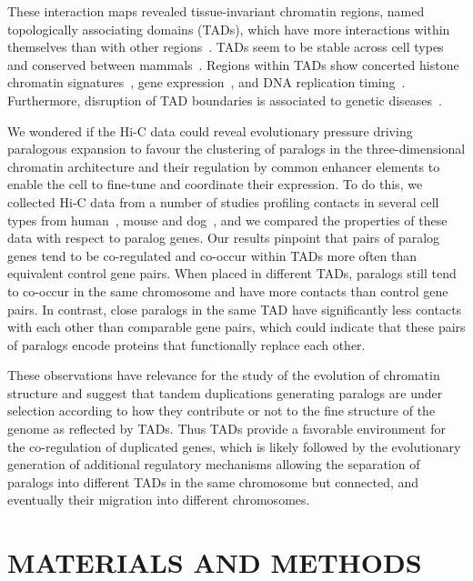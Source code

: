 \documentclass[a4paper,twoside=true,openright,parskip=full,chapterprefix=true,11pt,headings=normal,bibliography=totoc,listof=totoc,titlepage=on,captions=tableabove,draft=false]{scrreprt}
\theoremstyle{definition}
\theoremstyle{definition}
\theoremstyle{definition}
\theoremstyle{remark}
\begin{document}
These interaction maps revealed tissue-invariant chromatin regions,
named topologically associating domains (TADs), which have more
interactions within themselves than with other
regions~\citep{Dixon2012, Nora2012, Sexton2012}. TADs seem to be stable
across cell types and conserved between
mammals~\citep{Dixon2012, Rao2014, VietriRudan2015}. Regions within TADs
show concerted histone chromatin
signatures~\citep{Dixon2012, Sexton2012}, gene
expression~\citep{LeDily2014, Nora2012}, and DNA replication
timing~\citep{Pope2014}. Furthermore, disruption of TAD boundaries is
associated to genetic diseases~\citep{Ibn-Salem2014, Lupianez2015}.

We wondered if the Hi-C data could reveal evolutionary pressure driving
paralogous expansion to favour the clustering of paralogs in the
three-dimensional chromatin architecture and their regulation by common
enhancer elements to enable the cell to fine-tune and coordinate their
expression. To do this, we collected Hi-C data from a number of studies
profiling contacts in several cell types from
human~\citep{Dixon2012, Rao2014}, mouse and dog~\citep{VietriRudan2015},
and we compared the properties of these data with respect to paralog
genes. Our results pinpoint that pairs of paralog genes tend to be
co-regulated and co-occur within TADs more often than equivalent control
gene pairs. When placed in different TADs, paralogs still tend to
co-occur in the same chromosome and have more contacts than control gene
pairs. In contrast, close paralogs in the same TAD have significantly
less contacts with each other than comparable gene pairs, which could
indicate that these pairs of paralogs encode proteins that functionally
replace each other.

These observations have relevance for the study of the evolution of
chromatin structure and suggest that tandem duplications generating
paralogs are under selection according to how they contribute or not to
the fine structure of the genome as reflected by TADs. Thus TADs provide
a favorable environment for the co-regulation of duplicated genes, which
is likely followed by the evolutionary generation of additional
regulatory mechanisms allowing the separation of paralogs into different
TADs in the same chromosome but connected, and eventually their
migration into different chromosomes.

\section{MATERIALS AND METHODS}\label{sec:paralog-methods}
\end{document}
